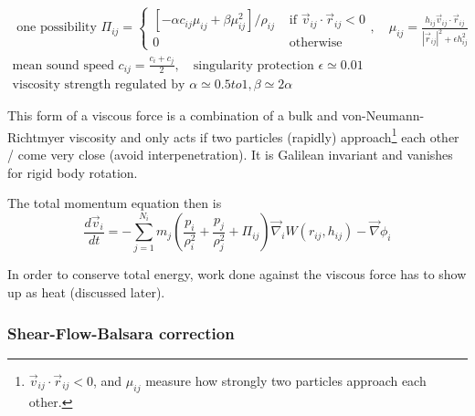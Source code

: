 \begin{equation}
    \begin{gathered}
        \text { one possibility } \Pi_{i j}=\left\{\begin{array}{cc}
            {\left[-\alpha c_{i j} \mu_{i j}+\beta \mu_{i j}^2\right] / \rho_{i j}} & \text { if } \vec{v}_{i j} \cdot \vec{r}_{i j}<0 \\
            0 & \text { otherwise }
            \end{array}, \quad \mu_{i j}=\frac{h_{i j} \vec{v}_{i j} \cdot \vec{r}_{i j}}{\left|\vec{r}_{i j}\right|^2+\epsilon h_{i j}^2}\right. \\
        \text{mean sound speed } c_{ij} = \frac{c_i + c_j}{2}, \quad \text{singularity protection } \epsilon \simeq 0.01 \\
        \text{viscosity strength regulated by } \alpha \simeq 0.5 to 1, \beta \simeq 2 \alpha
    \end{gathered}
\end{equation}

This form of a viscous force is a combination of a bulk and von-Neumann-Richtmyer viscosity and only acts if two particles (rapidly) approach\footnote{$\vec{v}_{i j} \cdot \vec{r}_{i j}<0$, and $\mu_{ij}$ measure how strongly two particles approach each other.} each other / come very close (avoid interpenetration). It is Galilean invariant and vanishes for rigid body rotation.

\begin{mdframed}[style = padded]
    The total momentum equation then is
    \begin{equation}
        \frac{d \vec{v}_i}{d t}=-\sum_{j=1}^{N_i} m_j\left(\frac{p_i}{\rho_i^2}+\frac{p_j}{\rho_j^2}+\Pi_{i j}\right) \vec{\nabla}_i W\left(r_{i j}, h_{i j}\right)-\vec{\nabla} \phi_i
    \end{equation}
\end{mdframed}


In order to conserve total energy, work done against the viscous force has to show up as heat (discussed later).

\subsubsection{Shear-Flow-Balsara correction}

